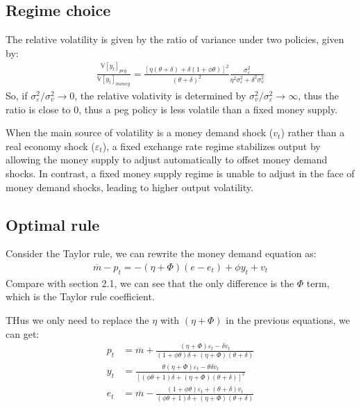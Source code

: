 \documentclass[a4paper,12pt]{article} %
\theoremstyle{nonitalic}
\begin{document}
\subsection{Regime choice}

The relative volatility is given by the ratio of variance under two policies, given by:
\begin{gather*}
    \frac{\mathbb{V}[y_t]_{peg}}{\mathbb{V}[y_t]_{money}} = \frac{\left[ \eta (\theta + \delta) + \delta (1 + \phi \theta) \right]^2}{(\theta + \delta)^2} \frac{\sigma_{\varepsilon}^2}{\eta^2 \sigma_{\varepsilon}^2 + \delta^2 \sigma_v^2}
\end{gather*}
So, if $\sigma_{\varepsilon}^2 / \sigma_v^2 \to 0$, the relative volativity is determined by $\sigma_v^2 / \sigma_{\varepsilon}^2 \to  \infty $, thus the ratio is close to 0,
thus a peg policy is less volatile than a fixed money supply.

When the main source of volatility is a money demand shock ($v_t$) rather than a real economy shock ($\varepsilon_t$),
a fixed exchange rate regime stabilizes output by allowing the money supply to adjust automatically to offset money demand shocks.
In contrast, a fixed money supply regime is unable to adjust in the face of money demand shocks,
leading to higher output volatility.

\subsection{Optimal rule}

Consider the Taylor rule, we can rewrite the money demand equation as:
\begin{gather*}
    \overline{m} - p_t = -(\eta + \Phi) (e - e_t) + \phi y_t + v_t 
\end{gather*}
Compare with section 2.1, we can see that the only difference is the $\Phi$ term, which is the Taylor rule coefficient.

THus we only need to replace the $\eta$ with $(\eta + \Phi)$ in the previous equations, we can get:
\begin{align*}
    p_t &= \overline{m} + \frac{(\eta + \Phi ) \varepsilon_t - \delta v_t}{(1 + \phi \theta)\delta + (\eta + \Phi) (\theta + \delta)} \\
    y_t &= \frac{\theta (\eta + \Phi) \varepsilon_t - \theta \delta v_t}{\left[ (\phi \theta + 1)\delta + (\eta + \Phi) (\theta + \delta) \right]^2} \\
    e_t &= \overline{m} - \frac{(1 + \phi \theta)\varepsilon_t + (\theta + \delta)v_t}{(\phi \theta + 1)\delta + (\eta + \Phi) (\theta + \delta)}
\end{align*}
\end{document}
